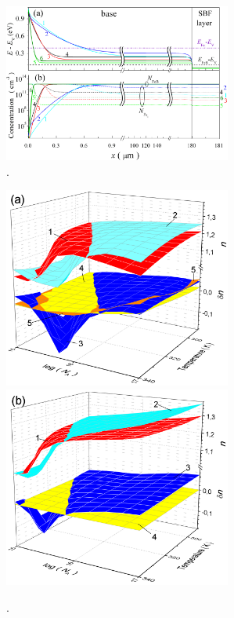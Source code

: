 \documentclass[12pt]{article}
\begin{document}
\begin{figure}
\includegraphics[width=7.5cm]{FigEfAll}
\caption{.
}
\label{FigEf}
\end{figure}

\begin{figure}
\includegraphics[width=7.5cm]{FigFe100d24} \hfill
\includegraphics[width=7.5cm]{FigFe103d24}
\caption{.
}
\label{FigTNa}
\end{figure}
\end{document}
